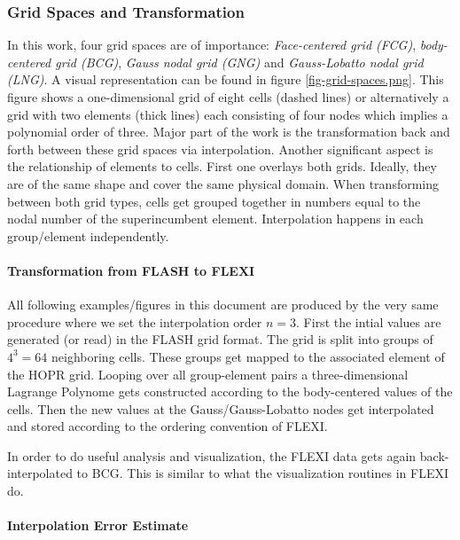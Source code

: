 \subsubsection{Grid Spaces and Transformation}

In this work, four grid spaces are of importance: \emph{Face-centered grid
(FCG)}, \emph{body-centered grid (BCG)}, \emph{Gauss nodal grid (GNG)} and
\emph{Gauss-Lobatto nodal grid (LNG)}. A visual representation can be found in
figure \ref{fig-grid-spaces.png}. This figure shows a one-dimensional grid of
eight cells (dashed lines) or alternatively a grid with two elements (thick
lines) each consisting of four nodes which implies a polynomial order of three.
Major part of the work is the transformation back and forth between these
grid spaces via interpolation. Another significant aspect is the relationship
of elements to cells. First one overlays both grids. Ideally, they are of the
same shape and cover the same physical domain. When transforming between both
grid types, cells get grouped together in numbers equal to the nodal number of
the superincumbent element. Interpolation happens in each group/element
independently.


\paragraph{Transformation from \textsc{FLASH} to \textsc{FLEXI}}

All following examples/figures in this document are produced by the very same
procedure where we set the interpolation order $n = 3$. First the intial values
are generated (or read) in the FLASH grid format. The grid is split into groups
of $4^3 = 64$ neighboring cells. These groups get mapped to the associated
element of the HOPR grid. Looping over all group-element pairs a
three-dimensional Lagrange Polynome gets constructed according to the
body-centered values of the cells. Then the new values at the
Gauss/Gauss-Lobatto nodes get interpolated and stored according to the ordering
convention of FLEXI.

In order to do useful analysis and visualization, the FLEXI data gets again
back-interpolated to BCG. This is similar to what the visualization routines in
FLEXI do.

\paragraph{Interpolation Error Estimate}


